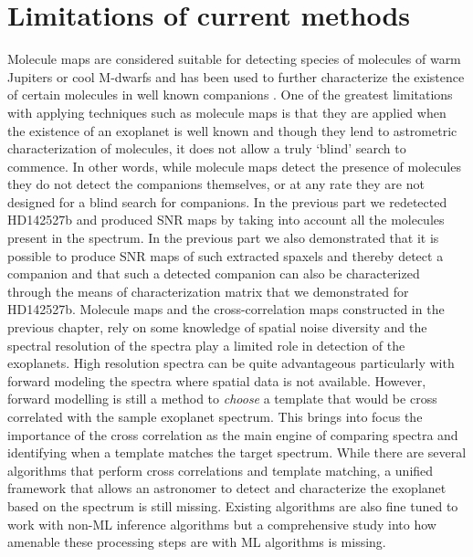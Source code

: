 \section{Limitations of current methods}
Molecule maps \citep{2018AHoeijmakersMM} are considered suitable for detecting species of molecules of warm Jupiters or cool M-dwarfs \cite{2023Malin} and has been used to further characterize the existence of certain molecules in well known companions \citep[e.g][]{2018Petit}.
One of the greatest limitations with applying techniques such as molecule maps is that they are applied when the existence of an exoplanet is well known and though they lend to astrometric characterization of molecules, it does not allow a truly `blind' search to commence.
In other words, while molecule maps detect the presence of molecules they do not detect the companions themselves, or at any rate they are not designed for a blind search for companions.
In the previous part we redetected HD142527b and produced SNR maps by taking into account all the molecules present in the spectrum.
In the previous part we also demonstrated that it is possible to produce SNR maps of such extracted spaxels and thereby detect a companion and that such a detected companion can also be characterized through the means of characterization matrix that we demonstrated for HD142527b.
Molecule maps and the cross-correlation maps constructed in the previous chapter, rely on some knowledge of spatial noise diversity and the spectral resolution of the spectra play a limited role in detection of the exoplanets.
High resolution spectra can be quite advantageous particularly with forward modeling the spectra \citep[e.g]{2021Ruffio,2021Wang} where spatial data is not available.
However, forward modelling is still a method to \textit{choose} a template that would be cross correlated with the sample exoplanet spectrum.
This brings into focus the importance of the cross correlation as the main engine of comparing spectra and identifying when a template matches the target spectrum.
While there are several algorithms that perform cross correlations and template matching, a unified framework that allows an astronomer to detect and characterize the exoplanet based on the spectrum is still missing.
Existing algorithms are also fine tuned to work with non-ML inference algorithms but a comprehensive study into how amenable these processing steps are with ML algorithms is missing.

